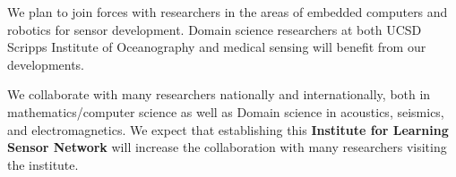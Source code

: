 \documentclass{article}
\begin{document}
We plan to join forces with researchers in the areas of embedded
computers and  robotics for sensor development. Domain science researchers  at both UCSD Scripps Institute of Oceanography and medical sensing will benefit from our developments.

We collaborate with many researchers nationally and  internationally, both in mathematics/computer science as well as Domain science in acoustics, seismics, and electromagnetics. We expect that establishing this {\bf Institute for  Learning Sensor Network} will increase the collaboration with many researchers visiting the institute.

\vspace{1cm}


    
    
\end{document}
